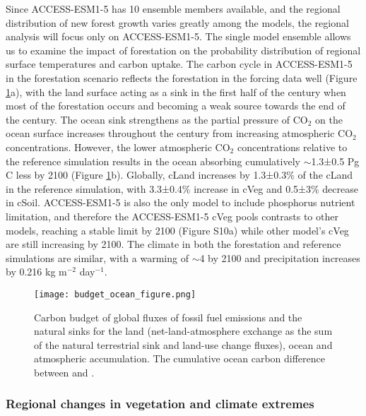 \documentclass[draft]{agujournal2019}
\begin{document}
Since ACCESS-ESM1-5 has 10 ensemble members available, and the regional distribution of new forest growth varies greatly among the models, the regional analysis will focus only on ACCESS-ESM1-5.
The single model ensemble allows us to examine the impact of forestation on the probability distribution of regional surface temperatures and carbon uptake.
The carbon cycle in ACCESS-ESM1-5 in the forestation scenario reflects the forestation in the forcing data well (Figure \ref{fig:global_carbon_budget}a), with the land surface acting as a sink in the first half of the century when most of the forestation occurs and becoming a weak source towards the end of the century.
The ocean sink strengthens as the partial pressure of CO$_2$ on the ocean surface increases throughout the century from increasing atmospheric CO$_2$ concentrations.
However, the lower atmospheric CO$_2$ concentrations relative to the reference simulation results in the ocean absorbing cumulatively $\sim$1.3±0.5 Pg C less by 2100 (Figure \ref{fig:global_carbon_budget}b).
Globally, cLand increases by 1.3±0.3\% of the cLand in the reference simulation, with 3.3±0.4\% increase in cVeg and 0.5±3\% decrease in cSoil.
ACCESS-ESM1-5 is also the only model to include phosphorus nutrient limitation, and therefore the ACCESS-ESM1-5 cVeg pools contrasts to other models, reaching a stable limit by 2100 (Figure S10a) while other model's cVeg are still increasing by 2100.
The climate in both the forestation and reference simulations are similar, with a warming of $\sim$4 \textcelsius{} by 2100 and precipitation increases by 0.216 kg m$^{-2}$ day$^{-1}$.

\begin{figure}
    \texttt{[image: budget\_ocean\_figure.png]}
    \caption{ Carbon budget of global fluxes of fossil fuel emissions and the natural sinks for the land (net-land-atmosphere exchange as the sum of the natural terrestrial sink and land-use change fluxes), ocean and atmospheric accumulation.  The cumulative ocean carbon difference between  and .}
    \label{fig:global_carbon_budget}
\end{figure}

\subsubsection{Regional changes in vegetation and climate extremes}
\end{document}

